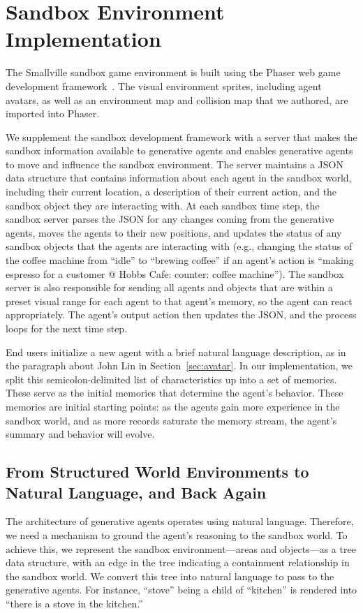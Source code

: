 \section{Sandbox Environment Implementation}\label{sec:implementation}
The Smallville sandbox game environment is built using the Phaser web game development framework~\cite{72_Phaser}. The visual environment sprites, including agent avatars, as well as an environment map and collision map that we authored, are imported into Phaser.

We supplement the sandbox development framework with a server that makes the sandbox information available to generative agents and enables generative agents to move and influence the sandbox environment. The server maintains a JSON data structure that contains information about each agent in the sandbox world, including their current location, a description of their current action, and the sandbox object they are interacting with. At each sandbox time step, the sandbox server parses the JSON for any changes coming from the generative agents, moves the agents to their new positions, and updates the status of any sandbox objects that the agents are interacting with (e.g., changing the status of the coffee machine from ``idle'' to ``brewing coffee'' if an agent's action is ``making espresso for a customer @ Hobbs Cafe: counter: coffee machine''). The sandbox server is also responsible for sending all agents and objects that are within a preset visual range for each agent to that agent's memory, so the agent can react appropriately. The agent's output action then updates the JSON, and the process loops for the next time step.

End users initialize a new agent with a brief natural language description, as in the paragraph about John Lin in Section~\ref{sec:avatar}. In our implementation, we split this semicolon-delimited list of characteristics up into a set of memories. These serve as the initial memories that determine the agent's behavior. These memories are initial starting points: as the agents gain more experience in the sandbox world, and as more records saturate the memory stream, the agent's summary and behavior will evolve. 

\subsection{From Structured World Environments to Natural Language, and Back Again} The architecture of generative agents operates using natural language. Therefore, we need a mechanism to ground the agent's reasoning to the sandbox world. To achieve this, we represent the sandbox environment---areas and objects---as a tree data structure, with an edge in the tree indicating a containment relationship in the sandbox world. We convert this tree into natural language to pass to the generative agents. For instance, ``stove'' being a child of ``kitchen'' is rendered into ``there is a stove in the kitchen.''

